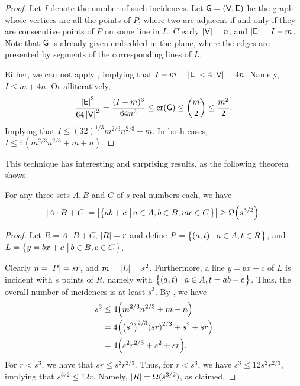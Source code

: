 \begin{proof}
    Let $I$ denote the number of such incidences. Let $\mathsf{G} =
    (\mathsf{V}, \mathsf{E})$ be the graph whose vertices are all the
    points of $P$, where two are adjacent if and only if they are
    consecutive points of $P$ on some line in $L$. Clearly $\left| {\mathsf{V}} \right|
    = n$, and $\left| {\mathsf{E}} \right| = I -m$.  Note that $\mathsf{G}$ is already
    given embedded in the plane, where the edges are presented by
    segments of the corresponding lines of $L$.
    
    Either, we can not apply , implying that $I - m
    = \left| {\mathsf{E}} \right| < 4 \left| {\mathsf{V}} \right| = 4n$. Namely, $I \leq m
    + 4n$. Or alliteratively,
    \begin{align*}
        \frac{\cardin{\Edges}^3}{64\cardin{\Vertices}^2}%
        =%
        \frac{(I-m)^3}{64n^2}%
        \leq%
        \CR(\Graph)%
        \leq%
        \binom{m}{2}%
        \leq%
        \frac{m^2}{2}.
    \end{align*}
    Implying that 
    $I \leq (32)^{1/3} m^{2/3} n^{2/3} + m$. In both cases,
    $I \leq 4 ( m^{2/3} n^{2/3} + m + n)$.
\end{proof}

This technique has interesting and surprising results, as
the following theorem shows.

\begin{theorem}
    For any three sets $A, B$ and $C$ of $s$ real numbers each, we
    have
    \begin{align*}
        \cardin{A \cdot B + C } = \cardin{\brc{ab+c \sep{ a \in A, b
                 \in B,m c \in C}}} \geq \Omega\pth{s^{3/2}}.
    \end{align*}
\end{theorem}

\begin{proof}
    Let $R = A \cdot B + C$, $\left| {R} \right| = r$ and define $P = \left\{ {
       (a,t) \,\left|\, { a \in A, t \in R} \bigr.\right.} \right\}$, and $L = \left\{ {y = bx + c \,\left|\, {
          b \in B, c \in C} \bigr.\right.} \right\}$.

    Clearly $n = \left| {P} \right| = s r$, and $m =\left| {L} \right| =
    s^2$. Furthermore, a line $y=bx+c$ of $L$ is incident with $s$
    points of $R$, namely with $\left\{ {(a,t)\,\left|\, {a \in A, t = ab +
          c} \bigr.\right.} \right\}$. Thus, the overall number of incidences is at least
    $s^3$. By , we have
    \begin{align*}
        s^3%
        &\leq%
        4 \pth[]{ m^{2/3} n^{2/3} + m + n}%
        \\&=%
        4 \pth[]{ \pth{s^2}^{2/3} \pth{s r }^{2/3} + s^2 + s r}%
        \\&=%
        4 \pth[]{ s^2 r^{2/3} + s^2 + s r}.
    \end{align*}
    For $r < s^{3}$, we have that $s r \leq s^{2} r^{2/3}$.  Thus, for
    $r < s^3$, we have $s^3 \leq 12 s^2 r^{2/3}$, implying that
    $s^{3/2} \leq 12r$. Namely, $\left| {R} \right|= \Omega(s^{3/2})$, as
    claimed.
\end{proof}

